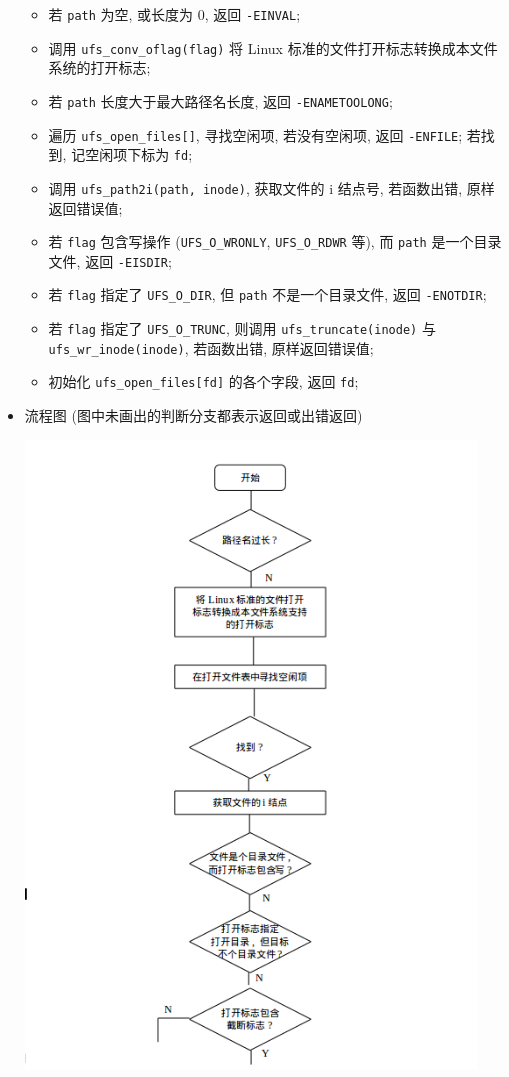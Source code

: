\documentclass[nofonts]{ctexart}
\begin{document}
\begin{itemize}
  \begin{itemize}
  \item
    若 \texttt{path} 为空, 或长度为 0, 返回 \texttt{-EINVAL};
  \item
    调用 \texttt{ufs\_conv\_oflag(flag)} 将 Linux
    标准的文件打开标志转换成本文件系统的打开标志;
  \item
    若 \texttt{path} 长度大于最大路径名长度, 返回
    \texttt{-ENAMETOOLONG};
  \item
    遍历 \texttt{ufs\_open\_files{[}{]}}, 寻找空闲项, 若没有空闲项, 返回
    \texttt{-ENFILE}; 若找到, 记空闲项下标为 \texttt{fd};
  \item
    调用 \texttt{ufs\_path2i(path, inode)}, 获取文件的 i 结点号,
    若函数出错, 原样返回错误值;
  \item
    若 \texttt{flag} 包含写操作 (\texttt{UFS\_O\_WRONLY},
    \texttt{UFS\_O\_RDWR} 等), 而 \texttt{path} 是一个目录文件, 返回
    \texttt{-EISDIR};
  \item
    若 \texttt{flag} 指定了 \texttt{UFS\_O\_DIR}, 但 \texttt{path}
    不是一个目录文件, 返回 \texttt{-ENOTDIR};
  \item
    若 \texttt{flag} 指定了 \texttt{UFS\_O\_TRUNC}, 则调用
    \texttt{ufs\_truncate(inode)} 与 \texttt{ufs\_wr\_inode(inode)},
    若函数出错, 原样返回错误值;
  \item
    初始化 \texttt{ufs\_open\_files{[}fd{]}} 的各个字段, 返回
    \texttt{fd};
  \end{itemize}
\item
  流程图
  (图中未画出的判断分支都表示返回或出错返回)

  \includegraphics[width=12cm]{./images/./open_1.png}


\end{itemize}
\end{document}
